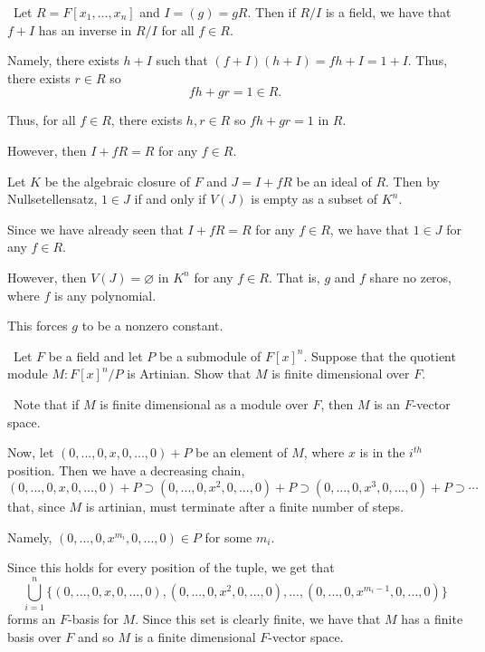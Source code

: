 \documentclass[12pt]{Qual}
\begin{document}
\begin{solution}$\,$
Let $R=F[x_1,...,x_n]$ and $I=(g)=gR$. Then if $R/I$ is a field, we have that $f+I$ has an inverse in $R/I$ for all $f\in R$.

Namely, there exists $h+I$ such that $(f+I)(h+I)=fh+I=1+I$. Thus, there exists $r\in R$ so $$fh+gr=1\in R.$$

Thus, for all $f\in R$, there exists $h,r\in R$ so $fh+gr=1$ in $R.$

However, then $I+fR=R$ for any $f\in R$.

Let $K$ be the algebraic closure of $F$ and $J=I+fR$ be an ideal of $R$. Then by Nullsetellensatz, $1\in J$ if and only if $V(J)$ is empty as a subset of $K^n$.

Since we have already seen that $I+fR=R$ for any $f\in R$, we have that $1\in J$ for any $f\in R$.

However, then $V(J)=\varnothing$ in $K^n$ for any $f\in R$. That is, $g$ and $f$ share no zeros, where $f$ is any polynomial.

This forces $g$ to be a nonzero constant.
\end{solution}
\newpage



\begin{problem} $\,$
Let $F$ be a field and let $P$ be a submodule of $F[x]^n.$ Suppose that the quotient module $M:F[x]^n/P$ is Artinian. Show that $M$ is finite dimensional over $F.$
\end{problem}


\begin{solution}$\,$
Note that if $M$ is finite dimensional as a module over $F$, then $M$ is an $F$-vector space.

Now, let $(0,...,0,x,0,...,0)+P$ be an element of $M$, where $x$ is in the $i^{th}$ position. Then we have a decreasing chain, $$(0,...,0,x,0,...,0)+P\supset(0,...,0,x^2,0,...,0)+P\supset(0,...,0,x^3,0,...,0)+P\supset\cdots$$ that, since $M$ is artinian, must terminate after a finite number of steps.

Namely, $(0,...,0,x^{m_i},0,...,0)\in P$ for some $m_i$.

Since this holds for every position of the tuple, we get that $$\bigcup_{i=1}^n\{(0,...,0,x,0,...,0),(0,...,0,x^2,0,...,0),...,(0,...,0,x^{m_i-1},0,...,0)\}$$ forms an $F$-basis for $M$. Since this set is clearly finite, we have that $M$ has a finite basis over $F$ and so $M$ is a finite dimensional $F$-vector space.
\end{solution}
\newpage
\end{document}
